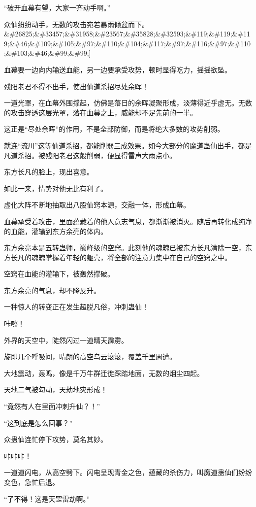 \begin{this_body}
“破开血幕有望，大家一齐动手啊。”

众仙纷纷动手，无数的攻击宛若暴雨倾盆而下。\&\#26825;\&\#33457;\&\#31958;\&\#23567;\&\#35828;\&\#32593;\&\#119;\&\#119;\&\#119;\&\#46;\&\#109;\&\#105;\&\#97;\&\#110;\&\#104;\&\#117;\&\#97;\&\#116;\&\#97;\&\#110;\&\#103;\&\#46;\&\#99;\&\#99;]

血幕要一边向内输送血能，另一边要承受攻势，顿时显得吃力，摇摇欲坠。

残阳老君不得不出手，使出仙道杀招尽处余晖！

一道光罩，在血幕外围撑起，仿佛是落日的余晖凝聚形成，淡薄得近乎虚无。无数的攻击穿透这层光罩，落在血幕之上，威能却不足先前的一半。

这正是“尽处余晖”的作用，不是全部防御，而是将绝大多数的攻势削弱。

就连“流川”这等仙道杀招，都能削弱三成效果。如今大部分的魔道蛊仙出手，都是凡道杀招。被残阳老君这般削弱，便显得雷声大雨点小。

东方长凡的脸上，现出喜意。

如此一来，情势对他无比有利了。

虚化大阵不断地抽取出八股仙窍本源，交融一体，形成血幕。

血幕承受着攻击，里面蕴藏着的他人意志气息，都渐渐被消灭。随后再转化成纯净的血能，灌输到东方余亮的体内。

东方余亮本是五转蛊师，巅峰级的空窍。此刻他的魂魄已被东方长凡清除一空，东方长凡的魂魄掌握着年轻的躯壳，将全部的注意力集中在自己的空窍之中。

空窍在血能的灌输下，被轰然撑破。

东方余亮的气息，却不降反升。

一种惊人的转变正在发生超脱凡俗，冲刺蛊仙！

咔嚓！

外界的天空中，陡然闪过一道晴天霹雳。

旋即几个呼吸间，晴朗的高空乌云滚滚，覆盖千里周遭。

大地震动，轰鸣，像是千万牛群迁徙踩踏地面，无数的烟尘四起。

天地二气被勾动，天劫地灾形成！

“竟然有人在里面冲刺升仙？！”

“这到底是怎么回事？”

众蛊仙连忙停下攻势，莫名其妙。

咔咔咔！

一道道闪电，从高空劈下。闪电呈现青金之色，蕴藏的杀伤力，叫魔道蛊仙们纷纷变色，急忙后退。

“了不得！这是天罡雷劫啊。”


\end{this_body}
